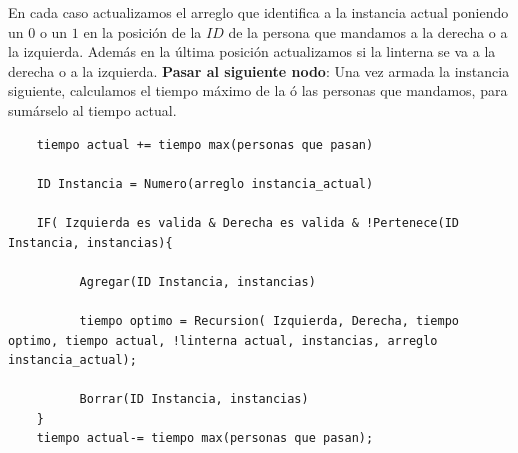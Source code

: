 En cada caso actualizamos el arreglo que identifica a la instancia actual poniendo un $0$ o un $1$ en la posición de la $ID$ de la persona que mandamos a la derecha o a la izquierda. Además en la última posición actualizamos si la linterna se va a la derecha o a la izquierda.
\newpage
\textbf{Pasar al siguiente nodo}:
Una vez armada la instancia siguiente, calculamos el tiempo máximo de la ó las personas que mandamos, para sumárselo al tiempo actual.
\begin{lstlisting}
    tiempo actual += tiempo max(personas que pasan)

    ID Instancia = Numero(arreglo instancia_actual) 				

    IF( Izquierda es valida & Derecha es valida & !Pertenece(ID Instancia, instancias){	
			
          Agregar(ID Instancia, instancias)
				
          tiempo optimo = Recursion( Izquierda, Derecha, tiempo optimo, tiempo actual, !linterna actual, instancias, arreglo instancia_actual);
				
          Borrar(ID Instancia, instancias)
    }
    tiempo actual-= tiempo max(personas que pasan);	
\end{lstlisting}

